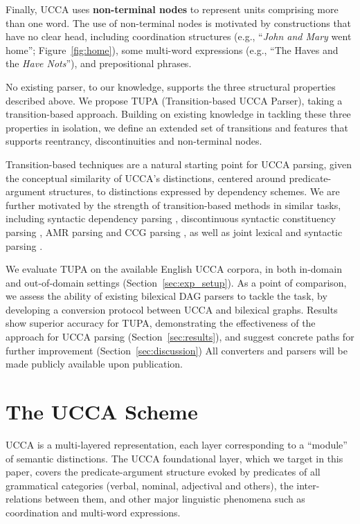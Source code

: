 \documentclass[11pt]{article}
\newcommand{\parser}[1]{TUPA\textsubscript{#1}}
\newcommand{\secref}[1]{Section~\ref{#1}}
\newcommand{\figref}[1]{Figure~\ref{#1}}
\begin{document}
Finally, UCCA uses \textbf{non-terminal nodes}
to represent units comprising more than one word.
The use of non-terminal nodes is motivated by constructions that have no clear head, including
coordination structures (e.g., ``\textit{John and Mary} went home''; \figref{fig:home}),
some multi-word expressions (e.g., ``The Haves and the \textit{Have Nots}''),
and prepositional phrases.

No existing parser, to our knowledge, supports the three structural properties described above.
We propose \parser{} (Transition-based UCCA Parser), taking a transition-based approach.
Building on existing knowledge in tackling these three properties
in isolation, we define an extended set of transitions and features
that supports reentrancy, discontinuities and non-terminal nodes.

Transition-based techniques are a natural
starting point for UCCA parsing, given the conceptual similarity of UCCA's distinctions,
centered around predicate-argument structures, to distinctions expressed by dependency schemes.
We are further motivated by the strength of transition-based methods
in similar tasks, including syntactic dependency parsing
\cite{dyer2015transition,andor2016globally,kiperwasser2016simple},
discontinuous syntactic constituency parsing \cite{maier-lichte:2016:DiscoNLP},
AMR parsing \cite{wang2015transition,wang-EtAl:2016:SemEval}
and CCG parsing \cite{ambati2015incremental,ambati-deoskar-steedman:2016:N16-1},
as well as joint lexical and syntactic parsing
\cite{constant-nivre:2016:P16-1}.

We evaluate \parser{} on the available English UCCA corpora, in both
in-domain and out-of-domain settings (\secref{sec:exp_setup}).
As a point of comparison, we assess the ability of existing bilexical DAG
parsers to tackle the task, by developing a conversion protocol
between UCCA and bilexical graphs.
Results show superior accuracy for \parser{}, demonstrating the effectiveness of
the approach for UCCA parsing (\secref{sec:results}),
and suggest concrete paths for further improvement (\secref{sec:discussion})
All converters and parsers will be made publicly available upon publication.


\section{The UCCA Scheme}\label{sec:ucca}

UCCA is a multi-layered representation, each layer corresponding
to a ``module'' of semantic distinctions.
The UCCA foundational layer, which we target in this paper, covers the predicate-argument
structure evoked by predicates of all grammatical categories
(verbal, nominal, adjectival and others), the inter-relations between them,
and other major linguistic phenomena such as coordination and multi-word expressions.
\end{document}
